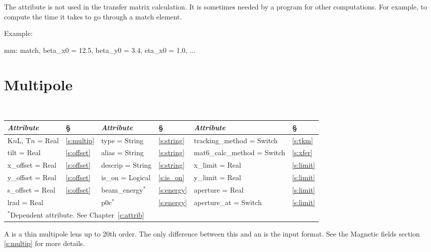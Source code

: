 {{
The attribute  is not used in the transfer matrix
calculation. It is sometimes needed by a program for other
computations. For example, to compute the time it takes to go through
a match element.

Example:
\begin{example}
  mm: match, beta_x0 = 12.5, beta_y0 = 3.4, eta_x0 = 1.0, ...
\end{example}

\section{Multipole}
\label{s:mult}

\begin{center}
\tt
\begin{tabular}{|l|l||l|l||l|l|} \hline
  {\sl Attribute} & \S  & {\sl Attribute} & \S & {\sl Attribute} & \S \\ \hline
  K$n$L, T$n$ = Real &  \ref{s:multip} &  type = String       & \ref{s:string} & tracking\_method = Switch   & \ref{s:tkm}   \\ \hline
  tilt       = Real  &  \ref{s:offset} &  alias = String      & \ref{s:string} & mat6\_calc\_method = Switch & \ref{s:xfer}  \\ \hline
  x\_offset  = Real  &  \ref{s:offset} &  descrip = String    & \ref{s:string} & x\_limit = Real             & \ref{s:limit} \\ \hline
  y\_offset  = Real  &  \ref{s:offset} &  is\_on = Logical    & \ref{s:is_on}  & y\_limit = Real             & \ref{s:limit} \\ \hline
  s\_offset  = Real  &  \ref{s:offset} &  beam\_energy$^*$    & \ref{s:energy} & aperture = Real             & \ref{s:limit} \\ \hline
  lrad       = Real  &                 &  p0c$^*$             & \ref{s:energy} & aperture\_at = Switch       & \ref{s:limit} \\ \hline
  \multicolumn{6}{l}{\small $^*$Dependent attribute. See Chapter~\ref{c:attrib}} \\
\end{tabular}
\end{center}
\toffset

A  is a thin multipole lens up to 20th order. The only
difference between this and an  is the input format. See the 
Magnetic fields section \ref{s:multip} for more details.

}}
